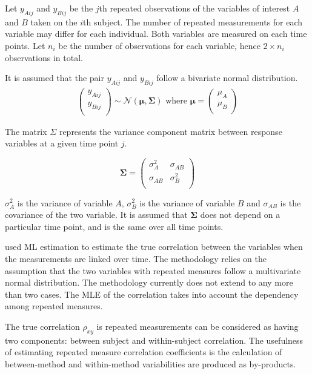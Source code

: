\documentclass[12pt, a4paper]{report}
\theoremstyle{plain}
\theoremstyle{definition}
\theoremstyle{remark}
\begin{document}
Let $y_{Aij}$ and $y_{Bij}$ be the $j$th repeated observations of the variables of interest $A$ and $B$ taken on the $i$th subject. The number of repeated measurements for each variable may differ for each individual.
Both variables are measured on each time points. Let $n_{i}$ be the number of observations for each variable, hence $2\times n_{i}$ observations in total.

It is assumed that the pair $y_{Aij}$ and $y_{Bij}$ follow a bivariate normal distribution.
\begin{eqnarray*}
	\left(
	\begin{array}{c}
		y_{Aij} \\
		y_{Bij} \\
	\end{array}
	\right) \sim \mathcal{N}(
	\boldsymbol{\mu}, \boldsymbol{\Sigma})\mbox{   where } \boldsymbol{\mu} = \left(
	\begin{array}{c}
		\mu_{A} \\
		\mu_{B} \\
	\end{array}
	\right)
\end{eqnarray*}

The matrix $\Sigma$ represents the variance component matrix between response variables at a given time point $j$.

\[
\boldsymbol{\Sigma} = \left( \begin{array}{cc}
\sigma^2_{A} & \sigma_{AB} \\
\sigma_{AB} & \sigma^2_{B}\\
\end{array}   \right)
\]

$\sigma^2_{A}$ is the variance of variable $A$, $\sigma^2_{B}$ is the variance of variable $B$ and $\sigma_{AB}$ is the covariance of the two variable. It is assumed that $\boldsymbol{\Sigma}$ does not depend on a particular time point, and is the same over all time points.

\citet{Lam} used ML estimation to estimate the true correlation between the variables when
the measurements are linked over time. The methodology relies on the assumption that the two variables with repeated measures follow a multivariate normal distribution. The methodology currently does not extend to any more than two cases. The MLE of the correlation takes into account the dependency among repeated measures.

The true correlation $\rho_{xy}$ is repeated measurements can be considered as having two components: between subject and within-subject correlation. The usefulness of estimating repeated measure correlation coefficients is the calculation of between-method and within-method variabilities are produced as by-products.
\end{document}
